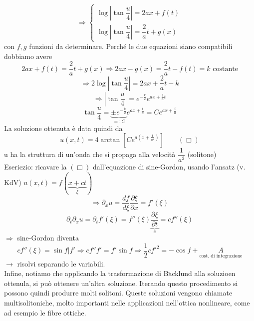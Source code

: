 \documentclass[a4paper,11pt]{report}
\newcommand{\Backlund}{B$\ddot{\text{a}}$cklund }
\begin{document}
$$
\Rightarrow \left\{ \begin{matrix}
\log \left| \tan \dfrac{u}{4}\right|=2ax + f(t) \\
\log \left| \tan \dfrac{u}{4}\right|= \dfrac{2}{a} t + g(x)
\end{matrix}
\right.
$$
con $f, g$ funzioni da determinare.
Perché le due equazioni siano compatibili dobbiamo avere
$$
2ax + f(t)=\dfrac{2}{a}t + g(x) \Rightarrow 2ax-g(x)=\dfrac{2}{a}t - f(t)=k \text{ costante}
$$
$$
\Rightarrow 2 \log \left| \tan \dfrac{u}{4}\right| = 2ax + \dfrac{2}{a}t - k
$$
$$
\Rightarrow  \left| \tan \dfrac{u}{4}\right| = e^{-\frac{k}{2}}e^{ax + \frac{1}{a}t}
$$
$$
\tan \dfrac{u}{4} = \underset{=:C}{\underbrace{\pm e^{-\frac{k}{2}}}}e^{ax + \frac{t}{a}}=Ce^{ax + \frac{t}{a}}
$$
La soluzione ottenuta è data quindi da
$$
u(x,t)=4\arctan \left[Ce^{a\left(x + \frac{t}{a^2}\right)}\right] \qquad (\Box)
$$
u ha la struttura di un'onda che si propaga alla velocità $\dfrac{1}{a^2}$ (solitone)\\
Esericzio: ricavare la $(\Box)$ dall'equazione di sine-Gordon, usando l'ansatz (v. KdV) $u(x,t)=f(\underset{\xi}{\underbrace{x+ct}})$
$$
\Rightarrow \partial_x u = \dfrac{df}{d\xi}\dfrac{\partial \xi}{\partial x}=f'(\xi)
$$
$$
\partial_t\partial_xu=\partial_tf'(\xi)=f''(\xi)\underset{c}{\underbrace{\dfrac{\partial \xi}{\partial t}}} = cf''(\xi)
$$
$\Rightarrow$ sine-Gordon diventa
$$
cf''(\xi)=\sin f | f' \Rightarrow cf''f'=f'\sin f \Rightarrow \dfrac{1}{2}cf'^2 = -\cos f + \underset{\text{cost. di integrazione}}{A}
$$
$\rightarrow$ risolvi separando le variabili.\\
Infine, notiamo che applicando la trasformazione di \Backlund alla soluzioen ottenula, si può ottenere un'altra soluzione. Iterando questo procedimento si possono quindi produrre molti solitoni. Queste soluzioni vengono chiamate multisolitoniche, molto importanti nelle applicazioni nell'ottica nonlineare, come ad esempio le fibre ottiche.
\end{document}
